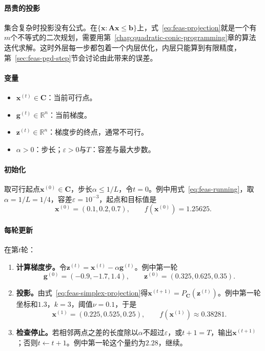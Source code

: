 \paragraph{昂贵的投影}
集合复杂时投影没有公式。在$\{\bm{x}:\bm{A}\bm{x}\leq\bm{b}\}$上，式~\eqref{eq:feas-projection}就是一个有$m$个不等式的二次规划，需要用第~\ref{chap:quadratic-conic-programming}章的算法迭代求解。这时外层每一步都包着一个内层优化，内层只能算到有限精度，第~\ref{sec:feas-pgd-step}节会讨论由此带来的误差。

\paragraph{变量}
\begin{itemize}
 \item $\bm{x}^{(t)}\in\bm{C}$：当前可行点。
 \item $\bm{g}^{(t)}\in\mathbb{R}^n$：当前梯度。
 \item $\bm{z}^{(t)}\in\mathbb{R}^n$：梯度步的终点，通常不可行。
 \item $\alpha>0$：步长；$\varepsilon>0$与$T$：容差与最大步数。
\end{itemize}

\paragraph{初始化}
取可行起点$\bm{x}^{(0)}\in\bm{C}$，步长$\alpha\leq1/L$，令$t=0$。例中用式~\eqref{eq:feas-running}，取$\alpha=1/L=1/4$，容差$\varepsilon=10^{-3}$，起点和目标值是
\[
 \bm{x}^{(0)}=(0.1,0.2,0.7),\qquad f(\bm{x}^{(0)})=1.25625.
\]

\paragraph{每轮更新}
在第$t$轮：
\begin{enumerate}
 \item \textbf{计算梯度步。}令$\bm{z}^{(t)}=\bm{x}^{(t)}-\alpha\bm{g}^{(t)}$。例中第一轮
 \[
  \bm{g}^{(0)}=(-0.9,-1.7,1.4),\qquad \bm{z}^{(0)}=(0.325,0.625,0.35).
 \]
 \item \textbf{投影。}由式~\eqref{eq:feas-simplex-projection}得$\bm{x}^{(t+1)}=P_{\bm{C}}(\bm{z}^{(t)})$。例中第一轮坐标和$1.3$，$k=3$，阈值$\nu=0.1$，于是
 \[
  \bm{x}^{(1)}=(0.225,0.525,0.25),\qquad f(\bm{x}^{(1)})\approx0.38281.
 \]
 \item \textbf{检查停止。}若相邻两点之差的长度除以$\alpha$不超过$\varepsilon$，或$t+1=T$，输出$\bm{x}^{(t+1)}$；否则$t\leftarrow t+1$。例中第一轮这个量约为$2.28$，继续。
\end{enumerate}


